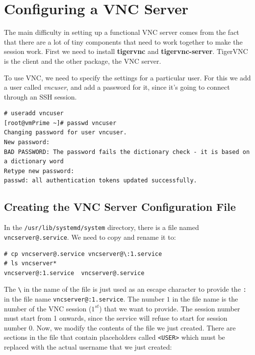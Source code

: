 \section{Configuring a VNC Server}
The main difficulty in setting up a functional VNC server comes from the fact that there are a lot of tiny components that need to work together to make the session work. First we need to install \textbf{tigervnc} and \textbf{tigervnc-server}. TigerVNC is the client and the other package, the VNC server. 

To use VNC, we need to specify the settings for a particular user. For this we add a user called \textit{vncuser}, and add a password for it, since it's  going to connect through an SSH session. 

\vspace{-15pt}
\begin{verbatim}
# useradd vncuser
[root@vmPrime ~]# passwd vncuser
Changing password for user vncuser.
New password: 
BAD PASSWORD: The password fails the dictionary check - it is based on a dictionary word
Retype new password: 
passwd: all authentication tokens updated successfully.
\end{verbatim}
\vspace{-10pt}

\subsection{Creating the VNC Server Configuration File}
In the \verb|/usr/lib/systemd/system| directory, there is a file named \verb|vncserver@.service|. We need to copy and rename it to:

\vspace{-15pt}
\begin{verbatim}
# cp vncserver@.service vncserver@\:1.service
# ls vncserver*
vncserver@:1.service  vncserver@.service
\end{verbatim}
\vspace{-10pt}

\noindent
The \verb|\| in the name of the file is just used as an escape character to provide the \verb|:| in the file name \verb|vncserver@:1.service|. The number $1$ in the file name is the number of the VNC session ($1^{st}$) that we want to provide. The session number must start from 1 onwards, since the service will refuse to start for session number 0. Now, we modify the contents of the file we just created. There are sections in the file that contain placeholders called \verb|<USER>| which must be replaced with the actual username that we just created:

